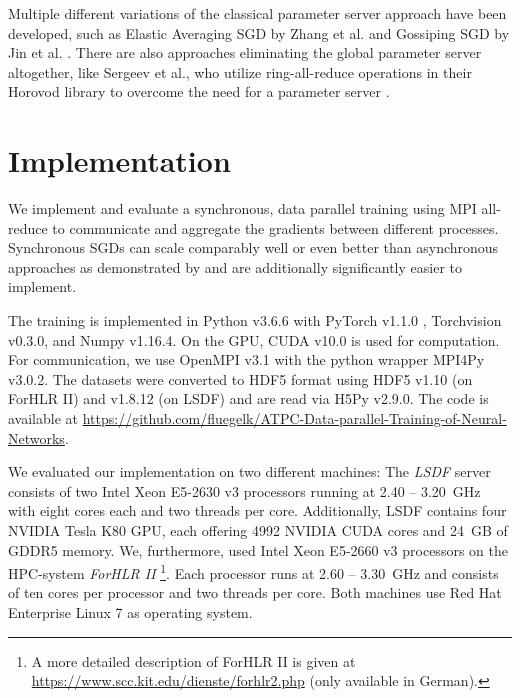 \documentclass[conference,compsoc,a4paper]{IEEEtran}
\begin{document}
Multiple different variations of the classical parameter server approach have been developed, such as Elastic Averaging SGD by Zhang et al. \cite{zhang2015-Elastic-AvgSGD} and Gossiping SGD by Jin et al. \cite{jin2016-How-to-scale}.
There are also approaches eliminating the global parameter server altogether, like Sergeev et al., who utilize ring-all-reduce operations in their Horovod library to overcome the need for a parameter server \cite{sergeev2018horovod}.






\section{Implementation} %
\label{sec:implementation}
We implement and evaluate a synchronous, data parallel training using MPI all-reduce to communicate and aggregate the gradients between different processes.
Synchronous SGDs can scale comparably well or even better than asynchronous approaches as demonstrated by \cite{jin2016-How-to-scale,chen2016-Revisiting-distributed-synchronous-SGD} and are additionally significantly easier to implement.

The training is implemented in Python v3.6.6 with PyTorch v1.1.0 \cite{paszke2017automatic}, Torchvision v0.3.0, and Numpy v1.16.4.
On the GPU, CUDA v10.0 is used for computation.
For communication, we use OpenMPI v3.1 with the python wrapper MPI4Py v3.0.2.
The datasets were converted to HDF5 format using HDF5 v1.10 (on ForHLR II) and v1.8.12 (on LSDF) and are read via H5Py v2.9.0.
The code is available at \url{https://github.com/fluegelk/ATPC-Data-parallel-Training-of-Neural-Networks}.

We evaluated our implementation on two different machines:
The \emph{LSDF} server consists of two Intel Xeon E5-2630 v3 processors running at 2.40 – 3.20~GHz with eight cores each and two threads per core.
Additionally, LSDF contains four NVIDIA Tesla K80 GPU, each offering 4992 NVIDIA CUDA cores and 24~GB of GDDR5 memory.
%
We, furthermore, used Intel Xeon E5-2660 v3 processors on the HPC-system \emph{ForHLR II}
\footnote{A more detailed description of ForHLR II is given at \url{https://www.scc.kit.edu/dienste/forhlr2.php} (only available in German).}.
Each processor runs at 2.60 – 3.30~GHz and consists of ten cores per processor and two threads per core.
%
Both machines use Red Hat Enterprise Linux 7 as operating system.
\end{document}
